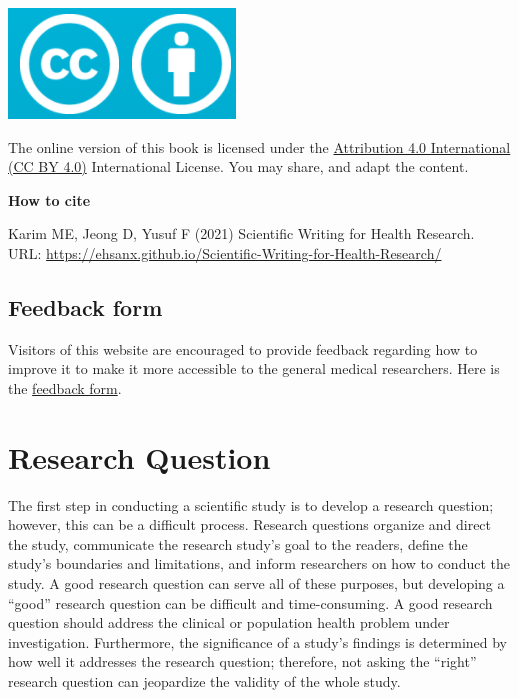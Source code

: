 \documentclass[
]{book}
\begin{document}
\includegraphics[width=0.25\linewidth]{images/by}

The online version of this book is licensed under the \href{https://creativecommons.org/licenses/by/4.0/}{Attribution 4.0 International (CC BY 4.0)} International License. You may share, and adapt the content.

\begin{rmdcomment}
\textbf{How to cite}

Karim ME, Jeong D, Yusuf F (2021) Scientific Writing for Health
Research. URL:
\url{https://ehsanx.github.io/Scientific-Writing-for-Health-Research/}
\end{rmdcomment}

\hypertarget{feedback-form}{%
\section*{Feedback form}\label{feedback-form}}

Visitors of this website are encouraged to provide feedback regarding how to improve it
to make it more accessible to the general medical researchers. Here is the \href{https://forms.gle/tzJ3YYP7P4edtgnW9}{feedback form}.

\hypertarget{research-question}{%
\chapter{Research Question}\label{research-question}}

The first step in conducting a scientific study is to develop a research question; however, this can be a difficult process. Research questions organize and direct the study, communicate the research study's goal to the readers, define the study's boundaries and limitations, and inform researchers on how to conduct the study. A good research question can serve all of these purposes, but developing a ``good'' research question can be difficult and time-consuming. A good research question should address the clinical or population health problem under investigation. Furthermore, the significance of a study's findings is determined by how well it addresses the research question; therefore, not asking the ``right'' research question can jeopardize the validity of the whole study.
\end{document}
